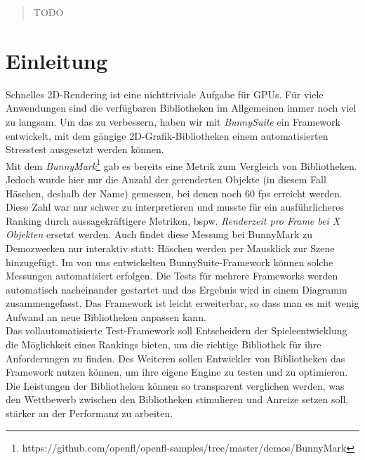 \begin{abstract}
TODO
\end{abstract}

\chapter{Einleitung}
Schnelles 2D-Rendering ist eine nichttriviale Aufgabe für GPUs. Für viele Anwendungen sind die verfügbaren Bibliotheken im Allgemeinen immer noch viel zu langsam. Um das zu verbessern, haben wir mit \textit{BunnySuite} ein Framework entwickelt, mit dem gängige 2D-Grafik-Bibliotheken einem automatisierten Stresstest ausgesetzt werden können.\\
Mit dem \textit{BunnyMark}\footnote{https://github.com/openfl/openfl-samples/tree/master/demos/BunnyMark} gab es bereits eine Metrik zum Vergleich von Bibliotheken. Jedoch wurde hier nur die Anzahl der gerenderten Objekte (in diesem Fall Häschen, deshalb der Name) gemessen, bei denen noch 60 fps erreicht werden. Diese Zahl war nur schwer zu interpretieren und musste für ein ausführlicheres Ranking durch aussagekräftigere Metriken, bspw. \textit{Renderzeit pro Frame bei X Objekten} ersetzt werden. Auch findet diese Messung bei BunnyMark zu Demozwecken nur interaktiv statt: Häschen werden per Mausklick zur Szene hinzugefügt. Im von uns entwickelten BunnySuite-Framework können solche Messungen automatisiert erfolgen. Die Tests für mehrere Frameworks werden automatisch nacheinander gestartet und das Ergebnis wird in einem Diagramm zusammengefasst. Das Framework ist leicht erweiterbar, so dass man es mit wenig Aufwand an neue Bibliotheken anpassen kann.\\
Das vollautomatisierte Test-Framework soll Entscheidern der Spieleentwicklung die Möglichkeit eines Rankings bieten, um die richtige Bibliothek für ihre Anforderungen zu finden. Des Weiteren sollen Entwickler von Bibliotheken das Framework nutzen können, um ihre eigene Engine zu testen und zu optimieren. Die Leistungen der Bibliotheken können so transparent verglichen werden, was den Wettbewerb zwischen den Bibliotheken stimulieren und Anreize setzen soll, stärker an der Performanz zu arbeiten. 

